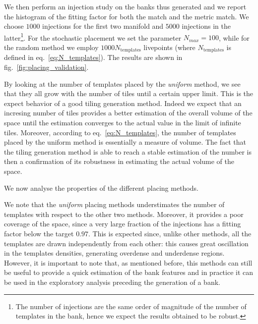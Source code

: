 \documentclass[twocolumn,showpacs,preprintnumbers,nofootinbib,prd,
superscriptaddress,10pt]{revtex4-1}
\begin{document}
We then perform an injection study on the banks thus generated and we report the histogram of the fitting factor for both the match and the metric match. We choose $1000$ injections for the first two manifold and $5000$ injections in the latter\footnote{
The number of injections are the same order of magnitude of the number of templates in the bank, hence we expect the results obtained to be robust.}.
For the stochastic placement we set the parameter $N_{max} = 100$, while for the random method we employ $1000 N_{\text{templates}}$ livepoints (where $N_{\text{templates}}$ is defined in eq.~\eqref{eq:N_templates}).
The results are shown in fig.~\ref{fig:placing_validation}.

By looking at the number of templates placed by the {\it uniform} method, we see that they all grow with the number of tiles until a certain upper limit. This is the expect behavior of a good tiling generation method. Indeed we expect that an incresing number of tiles provides a better estimation of the overall volume of the space until the estimation converges to the actual value in the limit of infinite tiles. Moreover, according to eq.~\eqref{eq:N_templates}, the number of templates placed by the uniform method is essentially a measure of volume.
The fact that the tiling generation method is able to reach a stable estimation of the number is then a confirmation of its robustness in estimating the actual volume of the space.

We now analyse the properties of the different placing methods.

We note that the {\it uniform} placing methods understimates the number of templates with respect to the other two methods. Moreover, it provides a poor coverage of the space, since a very large fraction of the injections has a fitting factor below the target $0.97$. This is expected since, unlike other methods, all the templates are drawn independently from each other: this causes great oscillation in the templates densities, generating overdense and underdense regions.
However, it is important to note that, as mentioned before, this methods can still be useful to provide a quick estimation of the bank features and in practice it can be used in the exploratory analysis preceding the generation of a bank.
\end{document}
